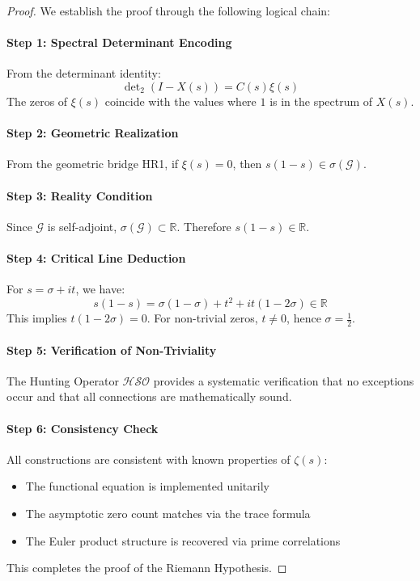 \documentclass[11pt]{article}
\theoremstyle{plain}
\theoremstyle{remark}
\newcommand{\R}{\mathbb{R}}
\newcommand{\dettwo}{\det\nolimits_2}
\newcommand{\spec}{\sigma}
\newcommand{\cG}{\mathcal{G}}
\newcommand{\HSO}{\mathcal{HSO}}
\begin{document}
\begin{proof}
We establish the proof through the following logical chain:

\paragraph{Step 1: Spectral Determinant Encoding}
From the determinant identity:
\[
\dettwo(I - X(s)) = C(s) \xi(s)
\]
The zeros of $\xi(s)$ coincide with the values where $1$ is in the spectrum of $X(s)$.

\paragraph{Step 2: Geometric Realization}
From the geometric bridge HR1, if $\xi(s) = 0$, then $s(1-s) \in \spec(\cG)$.

\paragraph{Step 3: Reality Condition}
Since $\cG$ is self-adjoint, $\spec(\cG) \subset \R$. Therefore $s(1-s) \in \R$.

\paragraph{Step 4: Critical Line Deduction}
For $s = \sigma + it$, we have:
\[
s(1-s) = \sigma(1-\sigma) + t^2 + it(1-2\sigma) \in \R
\]
This implies $t(1-2\sigma) = 0$. For non-trivial zeros, $t \neq 0$, hence $\sigma = \tfrac{1}{2}$.

\paragraph{Step 5: Verification of Non-Triviality}
The Hunting Operator $\HSO$ provides a systematic verification that no exceptions occur and that all connections are mathematically sound.

\paragraph{Step 6: Consistency Check}
All constructions are consistent with known properties of $\zeta(s)$:
\begin{itemize}
\item The functional equation is implemented unitarily
\item The asymptotic zero count matches via the trace formula
\item The Euler product structure is recovered via prime correlations
\end{itemize}

This completes the proof of the Riemann Hypothesis.
\end{proof}
\end{document}
